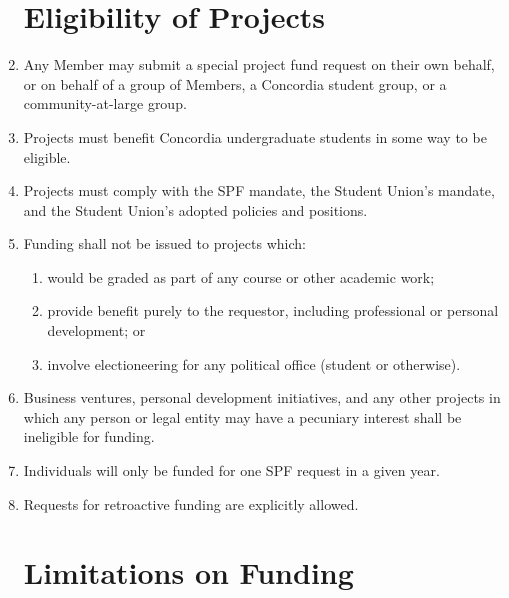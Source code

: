 \documentclass[oneside]{book}
\begin{document}
\begin{enumerate}
\chapter{\label{Eligibility_of_Projects}Eligibility of Projects}

\item Any Member may submit a special project fund request on their own behalf, or on behalf of a group of Members, a Concordia student group, or a community-at-large group.
\item Projects must benefit Concordia undergraduate students in some way to be eligible.
\item Projects must comply with the SPF mandate, the Student Union’s mandate, and the Student Union’s adopted policies and positions.
\item Funding shall not be issued to projects which: 
	\begin{enumerate}
	\item would be graded as part of any course or other academic work;
	\item provide benefit purely to the requestor, including professional or personal development; or
	\item involve electioneering for any political office (student or otherwise).
	\end{enumerate}
\item Business ventures, personal development initiatives, and any other projects in which any person or legal entity may have a pecuniary interest shall be ineligible for funding. 
\item Individuals will only be funded for one SPF request in a given year. 
\item Requests for retroactive funding are explicitly allowed.

\chapter{\label{Limitations_on_Funding}Limitations on Funding}


\end{enumerate}
\end{document}
